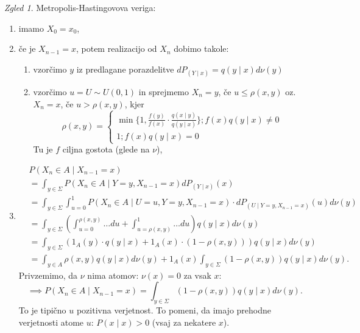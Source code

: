 \documentclass[a4paper, 12pt]{book}
\theoremstyle{definition}
\theoremstyle{remark}
\newtheorem*{exmp}{Zgled}
\begin{document}
\begin{exmp}
  Metropolis-Hastingovova veriga:
  \begin{enumerate}[label=(\arabic*)]
    \item imamo $X_0 = x_0$,
    \item če je $X_{n-1} = x$, potem realizacijo od $X_n$ dobimo takole:
      \begin{enumerate}[label=(\roman*)]
        \item vzorčimo $y$ iz predlagane porazdelitve $dP_{(Y \mid x)} = q(y \mid x) d\nu(y)$
        \item vzorčimo $u = U \sim U(0,1)$ in sprejmemo $X_n = y$, če $u \leq \rho(x, y)$
          oz. $X_n = x$, če $u > \rho(x,y)$, kjer
          \begin{equation*}
            \rho(x,y) = \begin{cases}
              \min \{1, \frac{f(y)}{f(x)} \cdot \frac{q(x \mid y)}{q(y \mid x)}\}; f(x) q(y \mid x) \neq 0 \\
              1; f(x) q(y \mid x) = 0
            \end{cases}
          \end{equation*}
          Tu je $f$ ciljna gostota (glede na $\nu$),
      \end{enumerate}
    \item 
      \begin{align*}
        &P(X_n \in A \mid X_{n-1}=x) \\
        &= \int_{y \in \Sigma} P(X_n \in A \mid Y=y, X_{n-1}=x) dP_{(Y \mid x)}(x) \\
        &= \int_{y \in \Sigma} \int_{u=0}^{1} P(X_n \in A \mid U=u, Y=y, X_{n-1}=x)
          \cdot dP_{(U \mid Y=y, X_{n-1}=x)}(u) d\nu(y) \\
        &= \int_{y \in \Sigma}
          \left(\int_{u=0}^{\rho(x,y)} \dots du + \int_{u=\rho(x,y)}^{1} \dots du\right)
          q(y \mid x) d\nu(y) \\
        &= \int_{y \in \Sigma} \left(1_A(y) \cdot q(y \mid x) + 1_A(x) \cdot (1-\rho(x,y))\right)
          q(y \mid x) d\nu(y) \\
        &= \int_{y \in A} \rho(x, y) q(y \mid x) d\nu(y)
          + 1_A(x) \int_{y \in \Sigma} (1-\rho(x,y)) q(y \mid x) d\nu(y).
      \end{align*}
      Privzemimo, da $\nu$ nima atomov: $\nu({x}) = 0$ za vsak $x$:
      \begin{equation*}
        \implies P(X_n \in A \mid X_{n-1} = x) = \int_{y \in \Sigma} (1-\rho(x,y)) q(y \mid x) d\nu(y).
      \end{equation*}
      To je tipično $u$ pozitivna verjetnost.
      To pomeni, da imajo prehodne verjetnosti atome $u$: $P({x} \mid x) > 0$ (vsaj za nekatere $x$).
  \end{enumerate}
\end{exmp}
\end{document}
